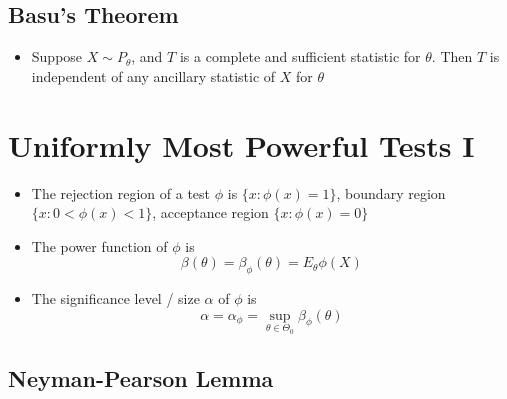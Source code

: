 \documentclass[fontsize=5pt]{scrartcl}
\begin{document}
\begin{multicols}{2}
\subsection{Basu's Theorem}

\begin{itemize}
\item Suppose $X\sim P_{\theta}$, and $T$ is a complete and sufficient
  statistic for $\theta$. Then $T$ is independent of any ancillary
  statistic of $X$ for $\theta$
\end{itemize}

\section{Uniformly Most Powerful Tests I}

\begin{itemize}
\item The rejection region of a test $\phi$ is $\{x:\phi(x)=1\}$,
  boundary region $\{x :0<\phi(x)<1\}$, acceptance region
  $\{x:\phi(x)=0\}$
\item The power function of $\phi$ is
  \begin{equation}
    \beta(\theta) = \beta_{\phi}(\theta) = E_{\theta}\phi(X)
  \end{equation}

\item The significance level / size $\alpha$ of $\phi$ is
  \begin{equation}
    \alpha=\alpha_{\phi}=\sup_{\theta\in\Theta_{0}}\beta_{\phi}(\theta)
  \end{equation}
\end{itemize}

\subsection{Neyman-Pearson Lemma}


\end{multicols}
\end{document}
